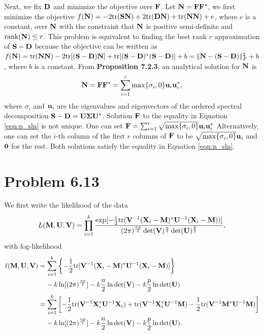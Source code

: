 \documentclass{scrartcl}
\begin{document}
Next, we fix $\mathbf{D}$ and minimize the objective over $\mathbf{F}$. Let $\mathbf{N} = \mathbf{F}\mathbf{F}^*$, we first minimize the objective
$f(\mathbf{N}) = - 2\mathrm{tr}(\mathbf{S}\mathbf{N}) + 2\mathrm{tr}(\mathbf{D}\mathbf{N}) + \mathrm{tr}(\mathbf{N}\mathbf{N}) + e$, where $e$ is a constant, over $\mathbf{N}$ with the constraint that
$\mathbf{N}$ is positive semi-definite and $\text{rank}(\mathbf{N}) \le r$. This problem is equivalent to finding the best rank $r$ approximation of $\mathbf{S}-\mathbf{D}$ because
the objective can be written as $f(\mathbf{N}) = \mathrm{tr}(\mathbf{N}\mathbf{N})-2\mathrm{tr}[(\mathbf{S}-\mathbf{D})\mathbf{N}]+\mathrm{tr}[(\mathbf{S}-\mathbf{D})^*(\mathbf{S}-\mathbf{D})]+b=\|\mathbf{N}-(\mathbf{S}-\mathbf{D})\|_F^2+b$,
where $b$ is a constant. From \textbf{Proposition 7.2.3}, an analytical solution for $\mathbf{N}$ is
\begin{equation}
\mathbf{N} = \mathbf{F}\mathbf{F}^* = \sum_{i=1}^r \max\{\sigma_i,0\} \mathbf{u}_i \mathbf{u}_i^*,
\label{eqn:n_sln}
\end{equation}
where $\sigma_i$ and $\mathbf{u}_i$ are the eigenvalues and eigenvectors of the ordered spectral decomposition $\mathbf{S}-\mathbf{D} = \mathbf{U}\mathbf{\Sigma}\mathbf{U}^*$.
Solution $\mathbf{F}$ to the equality in Equation \eqref{eqn:n_sln} is not unique. One can set $\mathbf{F} = \sum_{i=1}^r \sqrt{\max\{\sigma_i,0\}} \mathbf{u}_i \mathbf{u}_i^*$
Alternatively, one can set the $i$-th column of the first $r$ columns of $\mathbf{F}$ to be $\sqrt{\max\{\sigma_i,0\}} \mathbf{u}_i$ and $\mathbf{0}$ for the rest.
Both solutions satisfy the equality in Equation \eqref{eqn:n_sln}.


\section*{Problem 6.13}

We first write the likelihood of the data
\begin{equation}
L(\mathbf{M},\mathbf{U},\mathbf{V})
= \prod_{i=1}^k { {\exp [-{1 \over 2} \mathrm{tr}( \mathbf{V}^{-1}(\mathbf{X}_i-\mathbf{M})^*\mathbf{U}^{-1}(\mathbf{X}_i-\mathbf{M}) )]}
                  \over {(2\pi)^{{np} \over 2} \det(\mathbf{V})^{n \over 2} \det(\mathbf{U})^{p \over 2}}
                },
\end{equation}
with log-likelihood
\begin{equation}
\begin{split}
\ell (\mathbf{M},\mathbf{U},\mathbf{V}) & = \sum_{i=1}^k
 \left\lbrace -{1 \over 2} \mathrm{tr} [ \mathbf{V}^{-1}(\mathbf{X}_i-\mathbf{M})^*\mathbf{U}^{-1}(\mathbf{X}_i-\mathbf{M}) ] \right\rbrace \\
& {\;\;\;\;} - k \ln [ (2\pi)^{{np} \over 2} ] -  k {n \over 2} \ln \det(\mathbf{V}) - k {p \over 2} \ln \det(\mathbf{U}) \\
& = \sum_{i=1}^k \left[ -{1 \over 2} \mathrm{tr}(\mathbf{V}^{-1}\mathbf{X}_i^*\mathbf{U}^{-1}\mathbf{X}_i)
     + \mathrm{tr}(\mathbf{V}^{-1}\mathbf{X}_i^*\mathbf{U}^{-1}\mathbf{M}) - {1 \over 2} \mathrm{tr}(\mathbf{V}^{-1}\mathbf{M}^*\mathbf{U}^{-1}\mathbf{M}) \right] \\
& {\;\;\;\;} - k \ln [ (2\pi)^{{np} \over 2} ] -  k {n \over 2} \ln \det(\mathbf{V}) - k {p \over 2} \ln \det(\mathbf{U}) .
\end{split}
\end{equation}
\end{document}
